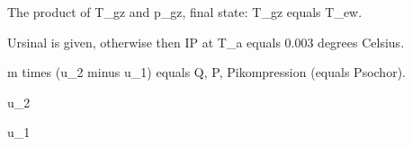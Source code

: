 The product of T_gz and p_gz, final state: T_gz equals T_ew.

Ursinal is given, otherwise then IP at T_a equals 0.003 degrees Celsius.

m times (u_2 minus u_1) equals Q, P, Pikompression (equals Psochor).

u_2

u_1